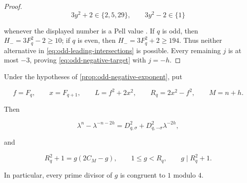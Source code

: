 \begin{proof}
\begin{equation}
 3y^2+2\in\{2,5,29\},
 \qquad
 3y^2-2\in\{1\}
 \label{eq:odd-near-square-values}
\end{equation}

whenever the displayed number is a Pell value
\cite[Table~1]{AlekseyevTengely2014}. If $q$ is odd, then
$H_-=3F_q^2-2\geqslant10$; if $q$ is even, then
$H_-=3F_q^2+2\geqslant194$. Thus neither alternative in
\cref{eq:odd-leading-intersections} is possible. Every remaining $j$ is at
most $-3$, proving \cref{eq:odd-negative-target} with $j=-h$.
\end{proof}

\begin{lemma}
\label{lem:odd-factorisation}
Under the hypotheses of \cref{prop:odd-negative-exponent}, put

\begin{equation}
 f=F_q,
 \qquad
 x=F_{q+1},
 \qquad
 L=f^2+2x^2,
 \qquad
 R_q=2x^2-f^2,
 \qquad
 M=n+h.
\end{equation}

Then

\begin{equation}
 \lambda^n-\lambda^{-n-2h}
 =D_{q,\sigma}^2+D_{q,-\sigma}^2\lambda^{-2h},
 \label{eq:odd-trace}
\end{equation}

and

\begin{equation}
 R_q^2+1=g(2C_M-g),
 \qquad
 1\leqslant g<R_q,
 \qquad
 g\mid R_q^2+1.
 \label{eq:odd-content-factorisation}
\end{equation}

In particular, every prime divisor of $g$ is congruent to $1$ modulo $4$.
\end{lemma}

